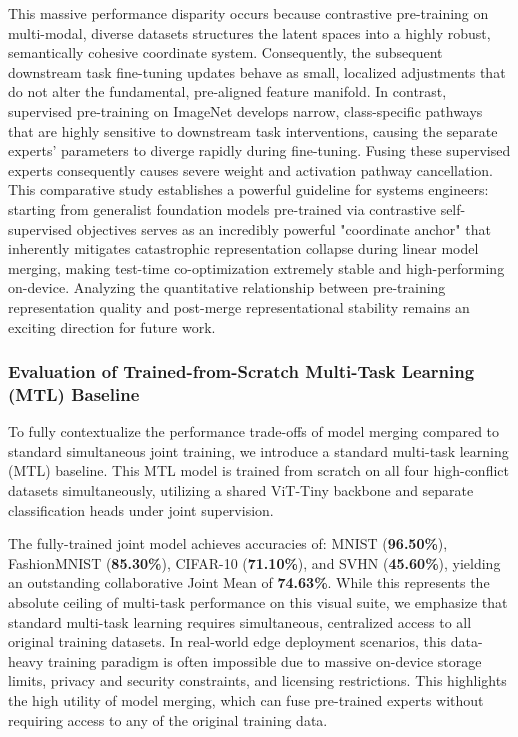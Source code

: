 This massive performance disparity occurs because contrastive pre-training on multi-modal, diverse datasets structures the latent spaces into a highly robust, semantically cohesive coordinate system. Consequently, the subsequent downstream task fine-tuning updates behave as small, localized adjustments that do not alter the fundamental, pre-aligned feature manifold. In contrast, supervised pre-training on ImageNet develops narrow, class-specific pathways that are highly sensitive to downstream task interventions, causing the separate experts' parameters to diverge rapidly during fine-tuning. Fusing these supervised experts consequently causes severe weight and activation pathway cancellation. This comparative study establishes a powerful guideline for systems engineers: starting from generalist foundation models pre-trained via contrastive self-supervised objectives serves as an incredibly powerful "coordinate anchor" that inherently mitigates catastrophic representation collapse during linear model merging, making test-time co-optimization extremely stable and high-performing on-device. Analyzing the quantitative relationship between pre-training representation quality and post-merge representational stability remains an exciting direction for future work.

\subsubsection{Evaluation of Trained-from-Scratch Multi-Task Learning (MTL) Baseline}
To fully contextualize the performance trade-offs of model merging compared to standard simultaneous joint training, we introduce a standard multi-task learning (MTL) baseline. This MTL model is trained from scratch on all four high-conflict datasets simultaneously, utilizing a shared ViT-Tiny backbone and separate classification heads under joint supervision.

The fully-trained joint model achieves accuracies of: MNIST (\textbf{96.50\%}), FashionMNIST (\textbf{85.30\%}), CIFAR-10 (\textbf{71.10\%}), and SVHN (\textbf{45.60\%}), yielding an outstanding collaborative Joint Mean of \textbf{74.63\%}. While this represents the absolute ceiling of multi-task performance on this visual suite, we emphasize that standard multi-task learning requires simultaneous, centralized access to all original training datasets. In real-world edge deployment scenarios, this data-heavy training paradigm is often impossible due to massive on-device storage limits, privacy and security constraints, and licensing restrictions. This highlights the high utility of model merging, which can fuse pre-trained experts without requiring access to any of the original training data.

